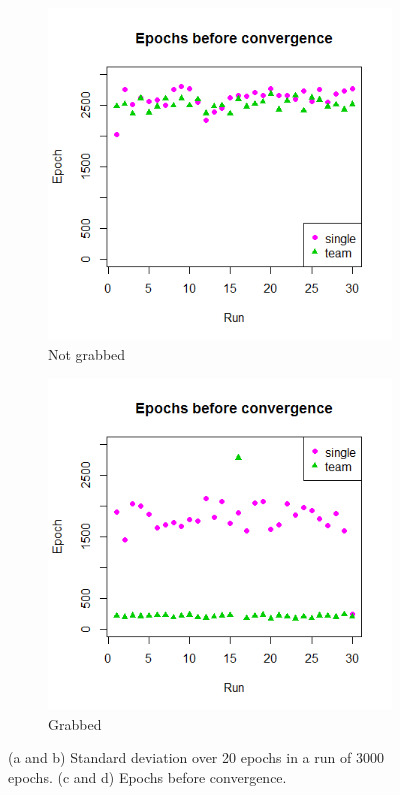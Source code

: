 \begin{figure}
\begin{subfigure}{.48\textwidth}
		\includegraphics[width=\textwidth]{images/Convergence_notgrabbed.png}
		\caption{Not grabbed}
		\label{3c}		
	\end{subfigure}
	\begin{subfigure}{0.48\textwidth}
		\centering
		\includegraphics[width=\textwidth]{images/Convergence_grabbed.png}
		\caption{Grabbed}
		\label{3d}		
	\end{subfigure}
	\caption{(a and b) Standard deviation over 20 epochs in a run of 3000 epochs. (c and d) Epochs before convergence.}
	\label{fig:Results3}
\end{figure}

